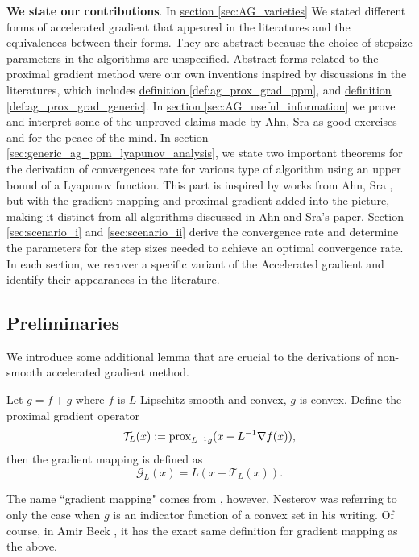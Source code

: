 \documentclass[12pt]{article}
\begin{document}
    \par\noindent
    \textbf{We state our contributions}. 
    In \hyperref[sec:AG_varieties]{section \ref*{sec:AG_varieties}} 
    We stated different forms of accelerated gradient that appeared in the literatures and the equivalences between their forms. 
    They are abstract because the choice of stepsize parameters in the algorithms are unspecified. 
    Abstract forms related to the proximal gradient method were our own inventions inspired by discussions in the literatures, which includes 
    \hyperref[def:ag_prox_grad_ppm]{definition \ref*{def:ag_prox_grad_ppm}}, and 
    \hyperref[def:ag_prox_grad_generic]{definition \ref*{def:ag_prox_grad_generic}}. 
    In \hyperref[sec:AG_useful_information]{section \ref*{sec:AG_useful_information}}
    we prove and interpret some of the unproved claims made by Ahn, Sra \cite{ahn_understanding_2022} as good exercises and for the peace of the mind. 
    In
    \hyperref[sec:generic_ag_ppm_lyapunov_analysis]{section \ref*{sec:generic_ag_ppm_lyapunov_analysis}},
    we state two important theorems for the derivation of convergences rate for various type of algorithm using an upper bound of a Lyapunov function. 
    This part is inspired by works from Ahn, Sra \cite{ahn_understanding_2022}, but with the gradient mapping and proximal gradient added into the picture, making it distinct from all algorithms discussed in Ahn and Sra's paper. 
    \hyperref[sec:scenario_i]{Section \ref*{sec:scenario_i}} and 
    \hyperref[sec:scenario_ii]{\ref*{sec:scenario_ii}} derive the convergence rate and determine the parameters for the step sizes needed to achieve an optimal convergence rate. 
    In each section, we recover a specific variant of the Accelerated gradient and identify their appearances in the literature. 

    
    \subsection{Preliminaries}
        We introduce some additional lemma that are crucial to the derivations of non-smooth accelerated gradient method. 
        \begin{definition}
            \label{def:gradient_mapping}
            Let $g = f + g$ where $f$ is $L$-Lipschitz smooth and convex, $g$ is convex. 
            Define the proximal gradient operator
            $$
                \mathcal T_L(x) := \operatorname{prox}_{L^{-1}g}(x - L^{-1}\nabla f(x)),
            $$
            then the gradient mapping is defined as
            $$
                \mathcal G_L(x) = L(x - \mathcal T_L(x)). 
            $$
        \end{definition}
        \begin{remark}
            The name ``gradient mapping" comes from \cite[(2.2.54)]{nesterov_lectures_2018}, however, Nesterov was referring to only the case when $g$ is an indicator function of a convex set in his writing. 
            Of course, in Amir Beck \cite[10.3.2]{beck_first-order_nodate}, it has the exact same definition for gradient mapping as the above. 
        \end{remark}
\end{document}
